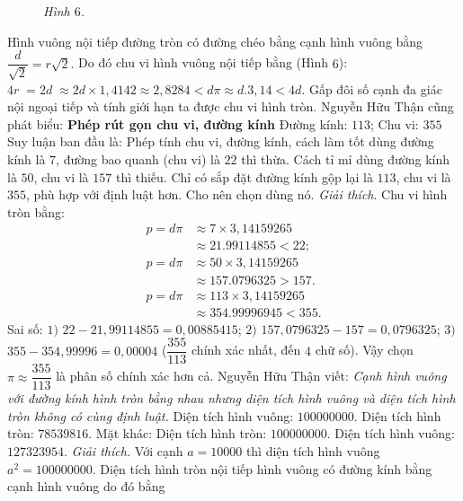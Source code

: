 \begin{multicols}{2}
\begin{figure}[H]
		\caption{\small\textit{\color{lichsutoanhoc}Hình $6$.}}
		\vspace*{-10pt}
	\end{figure}
	Hình vuông nội tiếp đường tròn có đường chéo bằng cạnh hình vuông bằng $\dfrac{d}{{\sqrt 2 }} = r\sqrt 2 .$ Do đó  chu vi hình vuông nội tiếp bằng (Hình $6$): $4r\; = 2d\; \approx 2d \times 1{,}4142 \approx 2{,}8284 < d\pi  \approx d.3{,}14 < 4d$.
	Gấp đôi số cạnh đa giác nội ngoại tiếp và tính giới hạn ta được chu vi hình tròn.
	Nguyễn Hữu Thận cũng phát biểu:
	\vskip 0.1cm
	\textbf{\color{lichsutoanhoc}Phép rút gọn chu vi, đường kính}
	\vskip 0.1cm 
	Đường kính: $113$;	Chu vi: $355$
	\vskip 0.1cm
	Suy luận ban đầu là: Phép tính chu vi, đường kính, cách làm tốt dùng đường kính là $7$, đường bao quanh (chu vi) là $22$ thì thừa. Cách tỉ mỉ dùng đường kính là $50$, chu vi là $157$ thì thiếu. Chỉ có sắp đặt đường kính gộp lại là $113$, chu vi là $355$, phù hợp với định luật hơn. Cho nên chọn dùng nó.
	\vskip 0.1cm 
	\textit{Giải thích}. Chu vi hình tròn bằng:
	\begin{align*}
		p = d\pi  &\approx 7 \times 3{,}14159265 \\
		&\approx 21.99114855 < 22;\\
		p = d\pi  &\approx 50 \times 3{,}14159265 \\
		&\approx 157.0796325 > 157.\\
		p=d\pi  &\approx 113 \times 3{,}14159265 \\
		&\approx 354.99996945 < 355.
	\end{align*}
	Sai số:
	\vskip 0.1cm 		
	$1)$ $22 - 21{,}99114855 = 0{,}00885415$;  
	\vskip 0.1cm
	$2)$ $157{,}0796325 - 157 = 0{,}0796325$;
	\vskip 0.1cm
	$3)$ $355 - 354{,}99996 = 0{,}00004$
	($\dfrac{{355}}{{113}}$ chính xác nhất, đến $4$ chữ số).
	\vskip 0.1cm
	Vậy chọn $\pi  \approx \dfrac{{355}}{{113}}$ là phân số chính xác hơn cả. 
	\vskip 0.1cm
	Nguyễn Hữu Thận viết: \textit{Cạnh hình vuông với đường kính hình tròn bằng nhau nhưng diện tích hình vuông và diện tích hình tròn không có cùng định luật.}
	\vskip 0.1cm
	Diện tích hình vuông: $100000000$.
	\vskip 0.1cm	
	Diện tích hình tròn: $78539816$.
	\vskip 0.1cm
	Mặt khác:
	\vskip 0.1cm
	Diện tích hình tròn: $100000000$.
	\vskip 0.1cm 	
	Diện tích hình vuông: $127323954$.
	\vskip 0.1cm
	\textit{Giải thích.} Với cạnh $a = 10000$ thì diện tích hình vuông ${a^2} = 100000000$. Diện tích hình tròn nội tiếp hình vuông có đường kính bằng cạnh hình vuông do đó bằng 

\end{multicols}
